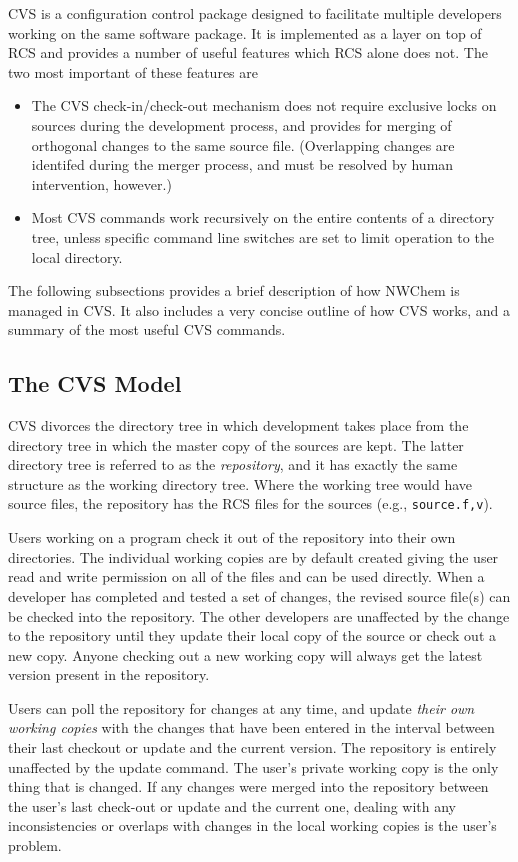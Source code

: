 CVS is a configuration
control package designed to facilitate multiple developers working on
the same software package.  It is implemented as a layer on top of RCS
and provides a number of useful features which RCS alone does not.
The two most important of these features are 
\begin{itemize}
\item The CVS check-in/check-out mechanism does not require exclusive
locks on sources during the development process, and provides for
merging of orthogonal changes to the same source file.  (Overlapping
changes are identifed during the merger process, and must be resolved
by human intervention, however.)
\item  Most CVS commands work recursively
on the entire contents of a directory tree, unless specific command line
switches are set to limit operation to the local directory.
\end{itemize}
The following subsections provides a brief description of how NWChem is managed in
CVS.  It also includes a very concise outline of how CVS works, and a
summary of the most useful CVS commands.

\subsection{The CVS Model}

CVS divorces the directory tree in which development takes place from
the directory tree in which the master copy of the sources are kept.
The latter directory tree is referred to as the {\em repository}, and
it has exactly the same structure as the working directory tree.  Where
the working tree would have source files, the repository has the RCS
files for the sources (e.g., {\tt source.f,v}).

Users working on a program check it out of the repository
into their own directories.  The individual working copies are by
default created giving the user read and write permission on all of
the files and can be used directly.  When a developer has completed
and tested a set of changes, the revised source file(s) can be checked into
the repository.  The other developers are unaffected by the change to
the repository until they update their local copy of the source or
check out a new copy.  Anyone checking out a new working copy will
always get the latest version present in the repository.

Users can poll the repository for changes at any time, and update {\em
their own working copies} with the changes that have been entered in the
interval between their last checkout or
update and the current version.  The repository is entirely unaffected
by the update command.  The user's private working copy is the only
thing that is changed.  If any changes were merged into the repository
between the user's last check-out or update and the current one,
dealing with any inconsistencies or overlaps with changes in the
local working copies is the user's problem.

